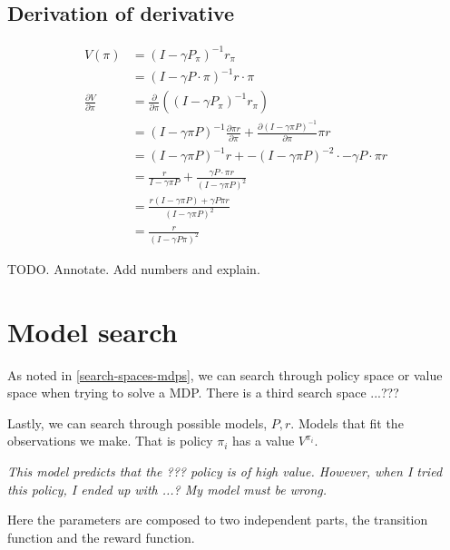 \subsection{Derivation of derivative}

\begin{align*}
V(\pi) &= (I − \gamma P_{\pi})^{−1}r_{\pi} \tag{value functional}\\
&= (I − \gamma P\cdot \pi)^{−1}r\cdot \pi \\
\frac{\partial V}{\partial \pi} &= \frac{\partial}{\partial \pi}((I-\gamma P_{\pi})^{-1} r_{\pi}) \\
&= (I-\gamma \pi P)^{-1} \frac{\partial \pi r}{\partial \pi}+   \frac{\partial (I-\gamma \pi P)^{-1}}{\partial \pi}\pi r\tag{product rule} \\
&= (I-\gamma \pi P)^{-1} r + -(I-\gamma \pi P)^{-2} \cdot -\gamma P\cdot \pi r\\
&= \frac{r}{I-\gamma \pi P} + \frac{ \gamma P\cdot \pi r}{(I-\gamma \pi P)^2} \tag{rewrite as fractions}\\
&= \frac{r(I-\gamma \pi P) + \gamma P \pi r}{(I-\gamma \pi P)^2} \tag{common demoninator}\\
& = \frac{r}{(I-\gamma P \pi)^2} \tag{cancel}
\end{align*}

TODO. Annotate. Add numbers and explain.



\section{Model search} \label{model-iteration}

As noted in \ref{search-spaces-mdps}, we can search through policy space or value
space when trying to solve a MDP. There is a third search space ...???



Lastly, we can search through possible models, $P, r$. Models that fit the
observations we make. That is policy $\pi_i$ has a value $V^{\pi_i}$.

\begin{displayquote}
  \textit{This model predicts that the ??? policy is of high value.
  However, when I tried this policy, I ended up with ...?
  My model must be wrong.}
\end{displayquote}

Here the parameters are composed to two independent parts, the transition function
and the reward function.

